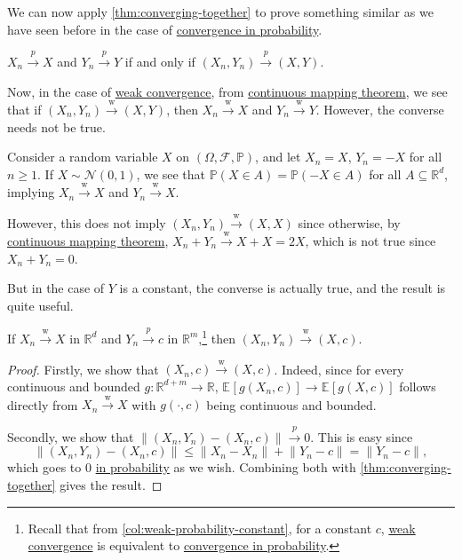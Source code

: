 We can now apply \autoref{thm:converging-together} to prove something similar as we have seen before in the case of \hyperref[def:converge-in-probability]{convergence in probability}.

\begin{prev}
	\(X_n \overset{p}{\to } X\) and \(Y_n \overset{p}{\to } Y\) if and only if \((X_n , Y_n) \overset{p}{\to } (X, Y)\).
\end{prev}

Now, in the case of \hyperref[def:weak-convergence]{weak convergence}, from \hyperref[thm:continuous-mapping]{continuous mapping theorem}, we see that if \((X_n , Y_n) \overset{\text{w} }{\to } (X, Y)\), then \(X_n \overset{\text{w} }{\to } X\) and \(Y_n \overset{\text{w} }{\to } Y\). However, the converse needs not be true.

\begin{eg}\label{eg:counter-example-continuous-mapping}
	Consider a random variable \(X\) on \((\Omega , \mathscr{F} , \mathbb{P} )\), and let \(X_n = X\), \(Y_n = -X\) for all \(n \geq 1\). If \(X \sim \mathcal{N} (0, 1)\), we see that \(\mathbb{P} (X \in A) = \mathbb{P} (-X \in A)\) for all \(A \subseteq \mathbb{R} ^d\), implying \(X_n \overset{\text{w} }{\to } X\) and \(Y_n \overset{\text{w} }{\to } X\).

	However, this does not imply \((X_n , Y_n) \overset{\text{w} }{\to } (X, X)\) since otherwise, by \hyperref[thm:continuous-mapping]{continuous mapping theorem}, \(X_n + Y_n \overset{\text{w} }{\to } X + X = 2X\), which is not true since \(X_n + Y_n = 0\).
\end{eg}

But in the case of \(Y\) is a constant, the converse is actually true, and the result is quite useful.

\begin{theorem}\label{thm:Slutsky}
	If \(X_n \overset{\text{w} }{\to } X \) in \(\mathbb{R} ^d\) and \(Y_n \overset{p}{\to } c\) in \(\mathbb{R} ^m\),\footnote{Recall that from \autoref{col:weak-probability-constant}, for a constant \(c\), \hyperref[def:weak-convergence]{weak convergence} is equivalent to \hyperref[def:converge-in-probability]{convergence in probability}.} then \((X_n , Y_n) \overset{\text{w} }{\to } (X, c)\).
\end{theorem}
\begin{proof}
	Firstly, we show that \((X_n , c) \overset{\text{w} }{\to } (X, c)\). Indeed, since for every continuous and bounded \(g \colon \mathbb{R} ^{d+m} \to \mathbb{R} \), \(\mathbb{E}_{}\left[g(X_n, c) \right] \to \mathbb{E}_{}\left[g(X, c) \right]\) follows directly from \(X_n \overset{\text{w} }{\to } X\) with \(g(\cdot, c)\) being continuous and bounded.

	Secondly, we show that \(\lVert (X_n, Y_n) - (X_n, c) \rVert \overset{p}{\to } 0\). This is easy since
	\[
		\lVert (X_n, Y_n) - (X_n, c) \rVert
		\leq \lVert X_n - X_n \rVert + \lVert Y_n - c \rVert
		= \lVert Y_n - c \rVert ,
	\]
	which goes to \(0\) \hyperref[def:converge-in-probability]{in probability} as we wish. Combining both with \autoref{thm:converging-together} gives the result.
\end{proof}

